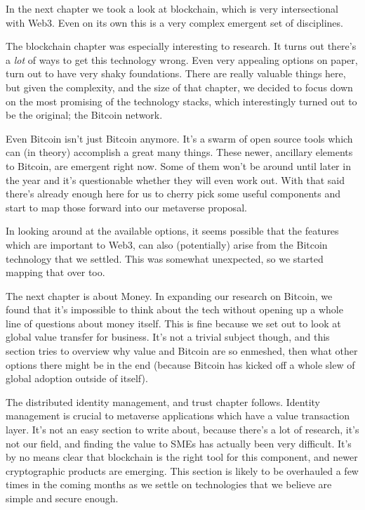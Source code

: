 In the next chapter we took a look at blockchain, which is very intersectional with Web3. Even on its own this is a very complex emergent set of disciplines. \par
The blockchain chapter was especially interesting to research. It turns out there’s a \textit{lot} of ways to get this technology wrong. Even very appealing options on paper, turn out to have very shaky foundations. There are really valuable things here, but given the complexity, and the size of that chapter, we decided to focus down on the most promising of the technology stacks, which interestingly turned out to be the original; the Bitcoin network.\par
Even Bitcoin isn’t just Bitcoin anymore. It’s a swarm of open source tools which can (in theory) accomplish a great many things. These newer, ancillary elements to Bitcoin, are emergent right now. Some of them won’t be around until later in the year and it’s questionable whether they will even work out. With that said there’s already enough here for us to cherry pick some useful components and start to map those forward into our metaverse proposal.\par
In looking around at the available options, it seems possible that the features which are important to Web3, can also (potentially) arise from the Bitcoin technology that we settled. This was somewhat unexpected, so we started mapping that over too.\par
The next chapter is about Money. In expanding our research on Bitcoin, we found that it’s impossible to think about the tech without opening up a whole line of questions about money itself. This is fine because we set out to look at global value transfer for business. It’s not a trivial subject though, and this section tries to overview why value and Bitcoin are so enmeshed, then what other options there might be in the end (because Bitcoin has kicked off a whole slew of global adoption outside of itself).\par
The distributed identity management, and trust chapter follows. Identity management is crucial to metaverse applications which have a value transaction layer. It’s not an easy section to write about, because there’s a lot of research, it’s not our field, and finding the value to SMEs has actually been very difficult. It's by no means clear that blockchain is the right tool for this component, and newer cryptographic products are emerging. This section is likely to be overhauled a few times in the coming months as we settle on technologies that we believe are simple and secure enough.\par
